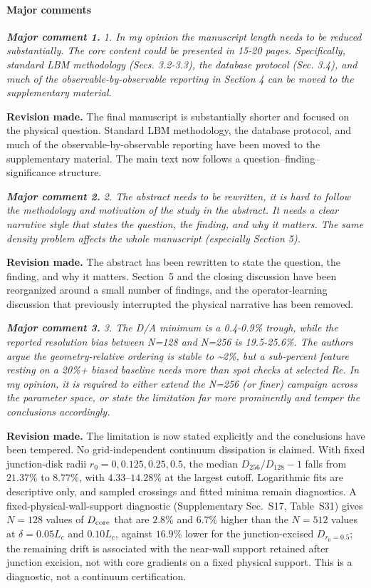 \documentclass[11pt,a4paper]{article}
\newcommand{\qcomment}[1]{\textcolor{deepblue}{\itshape #1}}
\newcommand{\revwork}[1]{\textbf{\textcolor{revgreen}{#1}}}
\begin{document}
\medskip
\paragraph{Major comments}

\medskip
\noindent\qcomment{\textbf{Major comment 1.} 1. In my opinion the manuscript length needs to be reduced substantially. The core content could be presented in 15-20 pages. Specifically, standard LBM methodology (Secs. 3.2-3.3), the database protocol (Sec. 3.4), and much of the observable-by-observable reporting in Section 4 can be moved to the supplementary material.}

\noindent\revwork{Revision made.} The final manuscript is substantially shorter and focused on the physical question. Standard LBM methodology, the database protocol, and much of the observable-by-observable reporting have been moved to the supplementary material. The main text now follows a question--finding--significance structure.

\medskip
\noindent\qcomment{\textbf{Major comment 2.} 2. The abstract needs to be rewritten, it is hard to follow the methodology and motivation of the study in the abstract. It needs a clear narrative style that states the question, the finding, and why it matters. The same density problem affects the whole manuscript (especially Section 5).}

\noindent\revwork{Revision made.} The abstract has been rewritten to state the question, the finding, and why it matters. Section~5 and the closing discussion have been reorganized around a small number of findings, and the operator-learning discussion that previously interrupted the physical narrative has been removed.

\medskip
\noindent\qcomment{\textbf{Major comment 3.} 3. The D/A minimum is a 0.4-0.9\% trough, while the reported resolution bias between N=128 and N=256 is 19.5-25.6\%. The authors argue the geometry-relative ordering is stable to \textasciitilde{}2\%, but a sub-percent feature resting on a 20\%+ biased baseline needs more than spot checks at selected Re. In my opinion, it is required to either extend the N=256 (or finer) campaign across the parameter space, or state the limitation far more prominently and temper the conclusions accordingly.}

\noindent\revwork{Revision made.} The limitation is now stated explicitly and the conclusions have been tempered. No grid-independent continuum dissipation is claimed. With fixed junction-disk radii $r_0=0,0.125,0.25,0.5$, the median $D_{256}/D_{128}-1$ falls from $21.37\%$ to $8.77\%$, with $4.33$--$14.28\%$ at the largest cutoff. Logarithmic fits are descriptive only, and sampled crossings and fitted minima remain diagnostics. A fixed-physical-wall-support diagnostic (Supplementary Sec.~S17, Table~S31) gives $N=128$ values of $D_{\rm core}$ that are $2.8\%$ and $6.7\%$ higher than the $N=512$ values at $\delta=0.05L_c$ and $0.10L_c$, against $16.9\%$ lower for the junction-excised $D_{r_0=0.5}$; the remaining drift is associated with the near-wall support retained after junction excision, not with core gradients on a fixed physical support. This is a diagnostic, not a continuum certification.
\end{document}
